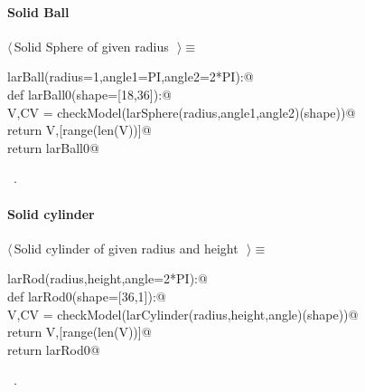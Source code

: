 \documentclass[11pt,oneside]{article}	%
\begin{document}
\paragraph{Solid Ball}
\begin{flushleft} \small \label{scrap17}
$\langle\,$Solid Sphere of given radius\nobreak\ {\footnotesize {}}$\,\rangle\equiv$
\vspace{-1ex}
\begin{list}{}{} \item
\mbox{}\verb@def larBall(radius=1,angle1=PI,angle2=2*PI):@\\
\mbox{}\verb@   def larBall0(shape=[18,36]):@\\
\mbox{}\verb@      V,CV = checkModel(larSphere(radius,angle1,angle2)(shape))@\\
\mbox{}\verb@      return V,[range(len(V))]@\\
\mbox{}\verb@   return larBall0@\\
\mbox{}\verb@@{\NWsep}
\end{list}
\vspace{-1ex}
\footnotesize\addtolength{\baselineskip}{-1ex}
\begin{list}{}{\setlength{\itemsep}{-\parsep}\setlength{\itemindent}{-\leftmargin}}
\item \NWtxtMacroRefIn\ .
\end{list}
\end{flushleft}

\paragraph{Solid cylinder}
\begin{flushleft} \small \label{scrap18}
$\langle\,$Solid cylinder of given radius and height\nobreak\ {\footnotesize {}}$\,\rangle\equiv$
\vspace{-1ex}
\begin{list}{}{} \item
\mbox{}\verb@def larRod(radius,height,angle=2*PI):@\\
\mbox{}\verb@   def larRod0(shape=[36,1]):@\\
\mbox{}\verb@      V,CV = checkModel(larCylinder(radius,height,angle)(shape))@\\
\mbox{}\verb@      return V,[range(len(V))]@\\
\mbox{}\verb@   return larRod0@\\
\mbox{}\verb@@{\NWsep}
\end{list}
\vspace{-1ex}
\footnotesize\addtolength{\baselineskip}{-1ex}
\begin{list}{}{\setlength{\itemsep}{-\parsep}\setlength{\itemindent}{-\leftmargin}}
\item \NWtxtMacroRefIn\ .
\end{list}
\end{flushleft}
\end{document}
